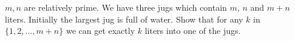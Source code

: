 $m, n$ are relatively prime. We have three jugs which contain $m$, $n$ and $m+n$ liters. Initially the largest jug is full of water. Show that for any $k$ in $\{1, 2, ... , m+n\}$ we can get exactly $k$ liters into one of the jugs.